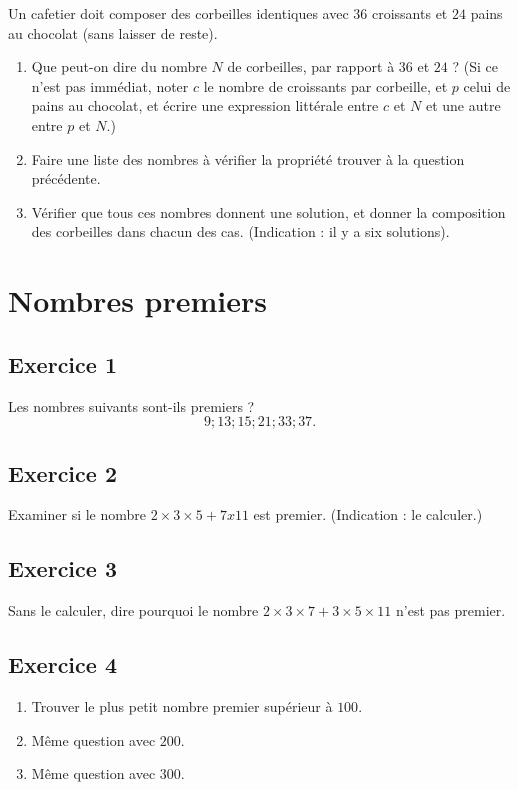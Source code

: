 \documentclass[12 pt]{article}
\theoremstyle{plain}
\newcounter{n}
\numberwithin{n}{section}
\begin{document}
Un cafetier doit composer des corbeilles identiques avec $36$ croissants et $24$ pains au chocolat (sans laisser de reste). 
\begin{enumerate}
\item Que peut-on dire du nombre $N$ de corbeilles, par rapport à $36$ et $24$ ? (Si ce n'est pas immédiat, noter $c$ le nombre de croissants par corbeille, et $p$ celui de pains au chocolat, et écrire une expression littérale entre $c$ et $N$ et une autre entre $p$ et $N$.)
\item Faire une liste des nombres à vérifier la propriété trouver à la question précédente. 
\item Vérifier que tous ces nombres donnent une solution, et donner la composition des corbeilles dans chacun des cas. (Indication : il y a six solutions). 
\end{enumerate}

\section*{Nombres premiers}
\subsection*{Exercice 1}

Les nombres suivants sont-ils premiers ? 
\[ 9 ; 13 ; 15 ; 21 ; 33; 37.\]

\subsection*{Exercice 2}

Examiner si le nombre $2\times 3 \times 5 + 7 x11$ est premier. (Indication : le calculer.)


\subsection*{Exercice 3}

Sans le calculer, dire pourquoi le nombre $2\times 3 \times 7 + 3 \times 5 \times 11$ n'est pas premier. 

\subsection*{Exercice 4}

\begin{enumerate}\item Trouver le plus petit nombre premier supérieur à $100$.
\item Même question avec $200$. 
\item Même question avec $300$. 
\end{enumerate}
\end{document}
